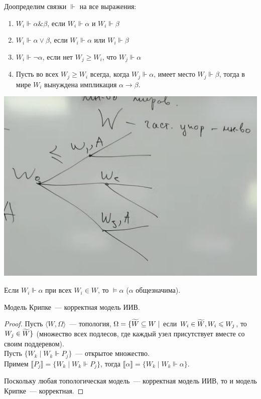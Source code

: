 \begin{definition}
Доопределим связки  $\Vdash$ на все выражения:
\begin{enumerate}
    \item $W_i \Vdash \alpha\& \beta$, если $W_i \Vdash \alpha$ и $W_i \Vdash \beta$
    \item $W_i \Vdash \alpha\lor \beta$, если $W_i \Vdash \alpha$ или $W_i \Vdash \beta$
    \item $W_i \Vdash \neg \alpha$, если нет $W_j \geqslant W_i$, что $W_j \Vdash \alpha$
    \item Пусть во всех $W_j \geqslant W_i$ всегда, когда $W_j \Vdash \alpha$, имеет место $W_j \Vdash \beta$, тогда в мире $W_i$ вынуждена импликация $\alpha \to \beta$.
\end{enumerate}
\end{definition}

\includegraphics[scale=0.7]{img/forced_variable_worlds}

\begin{definition}
    Если $W_i \Vdash \alpha$ при всех $W_i \in W$, то $\vDash \alpha$ ($\alpha$ общезначима).
\end{definition}


\begin{theorem}
    Модель Крипке~--- корректная модель ИИВ.
\end{theorem}
\begin{proof}
    Пусть $\langle W, \Omega\rangle$~--- топология, $\Omega = \{\widetilde{W} \subseteq W \mid$ если  $ W_i\in \widetilde{W}, W_i \leqslant W_j$, то $W_j \in \widetilde{W} \}$ (множество всех подлесов, где каждый узел присутствует вместе со своим поддеревом).\\
    Пусть $\{W_k \mid W_k \Vdash P_j\}$~--- открытое множество.\\
    Примем $\llbracket P_j \rrbracket = \{ W_k \mid W_k \Vdash P_j\}$, тогда $\llbracket \alpha \rrbracket = \{ W_k \mid W_k \Vdash \alpha\}$.

    Поскольку любая топологическая модель~--- корректная модель ИИВ, то и модель Крипке~--- корректная.
\end{proof}

